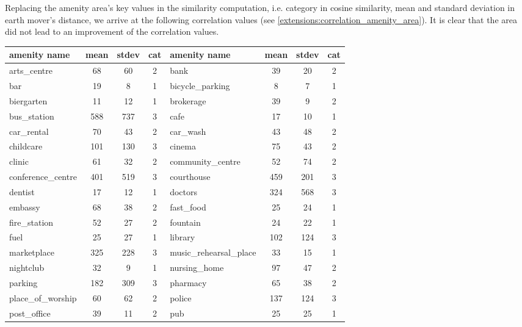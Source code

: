 Replacing the amenity area's key values in the similarity computation, i.e. category in cosine similarity, mean and standard deviation in earth mover's distance, we arrive at the following correlation values (see \ref{extensions:correlation_amenity_area}). It is clear that the area did not lead to an improvement of the correlation values.

\begin{table}[!ht]
	{\begin{tabular}{ | l | c | c | c || l | c | c | c |}
		\hline		
		\textbf{amenity name} & \textbf{mean} & \textbf{stdev} & \textbf{cat} & \textbf{amenity name} & \textbf{mean} & \textbf{stdev} & \textbf{cat} \\ \hline
		arts\_centre & 68 & 60 & 2 & bank & 39 & 20 & 2 \\ \hline
		bar & 19 & 8 & 1 & bicycle\_parking & 8 & 7 & 1 \\ \hline
		biergarten & 11 & 12 & 1 & brokerage & 39 & 9 & 2 \\ \hline
		bus\_station & 588 & 737 & 3 & cafe & 17 & 10 & 1 \\ \hline
		car\_rental & 70 & 43 & 2 & car\_wash & 43 & 48 & 2 \\ \hline
		childcare & 101 & 130 & 3 & cinema & 75 & 43 & 2 \\ \hline
		clinic & 61 & 32 & 2 & community\_centre & 52 & 74 & 2 \\ \hline
		conference\_centre & 401 & 519 & 3 & courthouse & 459 & 201 & 3 \\ \hline
		dentist & 17 & 12 & 1 & doctors & 324 & 568 & 3 \\ \hline
		embassy & 68 & 38 & 2 & fast\_food & 25 & 24 & 1 \\ \hline
		fire\_station & 52 & 27 & 2 & fountain & 24 & 22 & 1 \\ \hline
		fuel & 25 & 27 & 1 & library & 102 & 124 & 3 \\ \hline
		marketplace & 325 & 228 & 3 & music\_rehearsal\_place & 33 & 15 & 1 \\ \hline
		nightclub & 32 & 9 & 1 & nursing\_home & 97 & 47 & 2 \\ \hline
		parking & 182 & 309 & 3 & pharmacy & 65 & 38 & 2 \\ \hline
		place\_of\_worship & 60 & 62 & 2 & police & 137 & 124 & 3 \\ \hline
		post\_office & 39 & 11 & 2 & pub & 25 & 25 & 1 \\ \hline

\end{tabular}}
\end{table}
